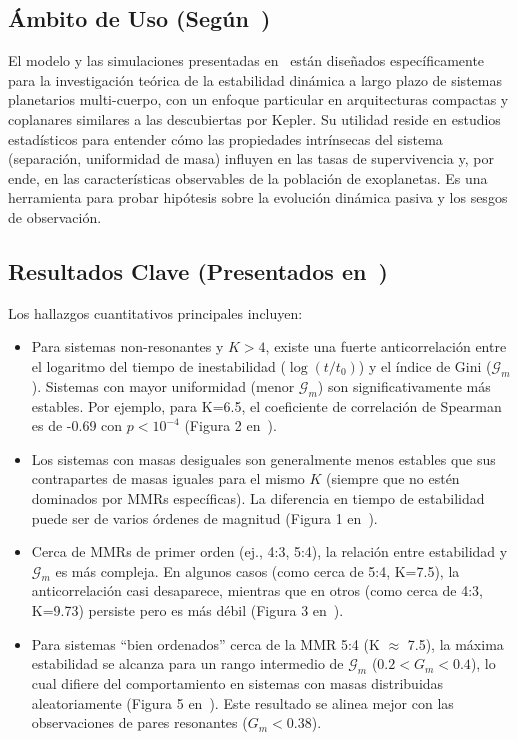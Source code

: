 \subsection{Ámbito de Uso (Según~\cite{Wu2025})}
El modelo y las simulaciones presentadas en~\cite{Wu2025} están diseñados específicamente para la investigación teórica de la estabilidad dinámica a largo plazo de sistemas planetarios multi-cuerpo, con un enfoque particular en arquitecturas compactas y coplanares similares a las descubiertas por Kepler. Su utilidad reside en estudios estadísticos para entender cómo las propiedades intrínsecas del sistema (separación, uniformidad de masa) influyen en las tasas de supervivencia y, por ende, en las características observables de la población de exoplanetas. Es una herramienta para probar hipótesis sobre la evolución dinámica pasiva y los sesgos de observación.

\subsection{Resultados Clave (Presentados en~\cite{Wu2025})}
Los hallazgos cuantitativos principales incluyen:
\begin{itemize}
    \item Para sistemas non-resonantes y $K > 4$, existe una fuerte anticorrelación entre el logaritmo del tiempo de inestabilidad ($\log(t/t_0)$) y el índice de Gini ($\mathcal{G}_m$). Sistemas con mayor uniformidad (menor $\mathcal{G}_m$) son significativamente más estables. Por ejemplo, para K=6.5, el coeficiente de correlación de Spearman es de -0.69 con $p < 10^{-4}$ (Figura 2 en~\cite{Wu2025}).
    \item Los sistemas con masas desiguales son generalmente menos estables que sus contrapartes de masas iguales para el mismo $K$ (siempre que no estén dominados por MMRs específicas). La diferencia en tiempo de estabilidad puede ser de varios órdenes de magnitud (Figura 1 en~\cite{Wu2025}).
    \item Cerca de MMRs de primer orden (ej., 4:3, 5:4), la relación entre estabilidad y $\mathcal{G}_m$ es más compleja. En algunos casos (como cerca de 5:4, K=7.5), la anticorrelación casi desaparece, mientras que en otros (como cerca de 4:3, K=9.73) persiste pero es más débil (Figura 3 en~\cite{Wu2025}).
    \item Para sistemas ``bien ordenados'' cerca de la MMR 5:4 (K $\approx$ 7.5), la máxima estabilidad se alcanza para un rango intermedio de $\mathcal{G}_m$ ($0.2 < G_m < 0.4$), lo cual difiere del comportamiento en sistemas con masas distribuidas aleatoriamente (Figura 5 en~\cite{Wu2025}). Este resultado se alinea mejor con las observaciones de pares resonantes ($G_m < 0.38$).
\end{itemize}


